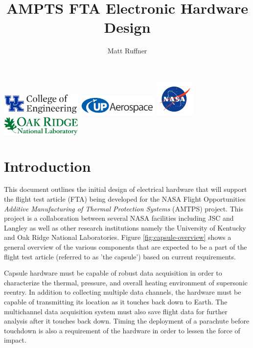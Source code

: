 \documentclass{article}
\title{AMPTS FTA Electronic Hardware Design}
\author{Matt Ruffner}
\date
\begin{document}
\maketitle
\begin{center}
	\includegraphics[width=4cm]{images/ukcoe.png}
	\includegraphics[width=4cm]{images/upaero-logo.png}
	\includegraphics[width=2cm]{images/nasa-logo.png}
	\includegraphics[width=4cm]{images/ornl.pdf}	
\end{center}
\tableofcontents \newpage
\listoffigures 
\listoftables \newpage



\section{Introduction}
This document outlines the initial design of electrical hardware that will support the flight test article (FTA) being developed for the NASA Flight Opportunities \textit{Additive Manufacturing of Thermal Protection Systems} (AMTPS) project. This project is a collaboration between several NASA facilities including JSC and Langley as well as other research institutions namely the University of Kentucky and Oak Ridge National Laboratories. Figure \ref{fig:capsule-overview} shows a general overview of the various components that are  expected to be a part of the flight test article (referred to as 'the capsule') based on current requirements.

Capsule hardware must be capable of robust data acquisition in order to characterize the thermal, pressure, and overall heating environment of supersonic reentry. In addition to collecting multiple data channels, the hardware must be capable of transmitting its location as it touches back down to Earth. The multichannel data acquisition system must also save flight data for further analysis after it touches back down. Timing the deployment of a parachute before touchdown is also a requirement of the hardware in order to lessen the force of impact.
\end{document}
